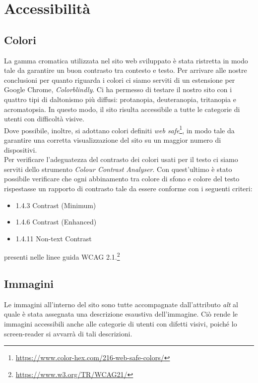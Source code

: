 \section{Accessibilità}
\subsection{Colori}
La gamma cromatica utilizzata nel sito web sviluppato è stata ristretta in modo tale da garantire un buon contrasto tra contesto e testo. Per arrivare alle nostre conclusioni per quanto riguarda i colori ci siamo
serviti di un estensione per Google Chrome, \textit{Colorblindly}. Ci ha permesso di testare il nostro sito con i quattro tipi di daltonismo più diffusi: protanopia, deuteranopia, tritanopia e acromatopsia. In questo modo, il sito risulta accessibile a tutte le categorie di utenti con difficoltà visive.\\
Dove possibile, inoltre, si adottano colori definiti \textit{web safe}\footnote{\url{https://www.color-hex.com/216-web-safe-colors/}}, in modo tale da garantire una corretta visualizzazione del sito su un maggior numero di dispositivi.\\
Per verificare l'adeguatezza del contrasto dei colori usati per il testo ci siamo serviti dello strumento \textit{Colour Contrast Analyser}. Con quest'ultimo è stato possibile verificare che ogni abbinamento tra colore di sfono e colore del testo rispestasse un rapporto di contrasto tale da essere conforme con i seguenti criteri:
\begin{itemize}
	\item 1.4.3 Contrast (Minimum)
	\item 1.4.6 Contrast (Enhanced)
	\item 1.4.11 Non-text Contrast
\end{itemize} 
presenti nelle linee guida WCAG 2.1.\footnote{\url{https://www.w3.org/TR/WCAG21/}} 

\subsection{Immagini}
Le immagini all'interno del sito sono tutte accompagnate dall'attributo \textit{alt} al quale è stata assegnata una descrizione esaustiva dell'immagine. Ciò rende le immagini accessibili anche alle categorie di utenti con difetti visivi, poiché lo screen-reader si avvarrà di tali descrizioni.

